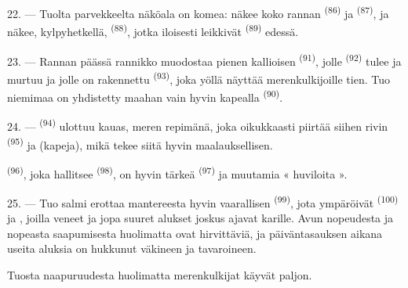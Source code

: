 22. --- Tuolta parvekkeelta näköala on komea: näkee koko rannan
 \textsuperscript{(86)} ja 
\textsuperscript{(87)}, ja näkee, kylpyhetkellä, 
\textsuperscript{(88)}, jotka iloisesti leikkivät 
\textsuperscript{(89)} edessä.

23. --- Rannan päässä rannikko muodostaa pienen kallioisen 
\textsuperscript{(91)}, jolle  \textsuperscript{(92)} tulee ja
murtuu ja jolle on rakennettu  \textsuperscript{(93)}, joka yöllä
näyttää merenkulkijoille tien. Tuo niemimaa on yhdistetty maahan vain hyvin
kapealla  \textsuperscript{(90)}.

\VUsaut{3.0mm}
\VUsaut{3.0mm}

24. ---  \textsuperscript{(94)} ulottuu kauas, meren
repimänä, joka oikukkaasti piirtää siihen rivin 
\textsuperscript{(95)} ja  (kapeja), mikä tekee siitä hyvin
maalauksellisen.

 \textsuperscript{(96)}, joka hallitsee
 \textsuperscript{(98)}, on hyvin tärkeä 
\textsuperscript{(97)} ja muutamia « huviloita ».

25. --- Tuo salmi erottaa mantereesta hyvin vaarallisen 
\textsuperscript{(99)}, jota ympäröivät  \textsuperscript{(100)}
ja , joilla veneet ja jopa suuret alukset joskus ajavat
karille. Avun nopeudesta ja  nopeasta saapumisesta
huolimatta  ovat hirvittäviä, ja päiväntasauksen
 aikana useita aluksia on hukkunut väkineen ja tavaroineen.

Tuosta naapuruudesta huolimatta merenkulkijat käyvät 
paljon.
\VUsaut{6.0mm}
\VUfilet{22mm}
